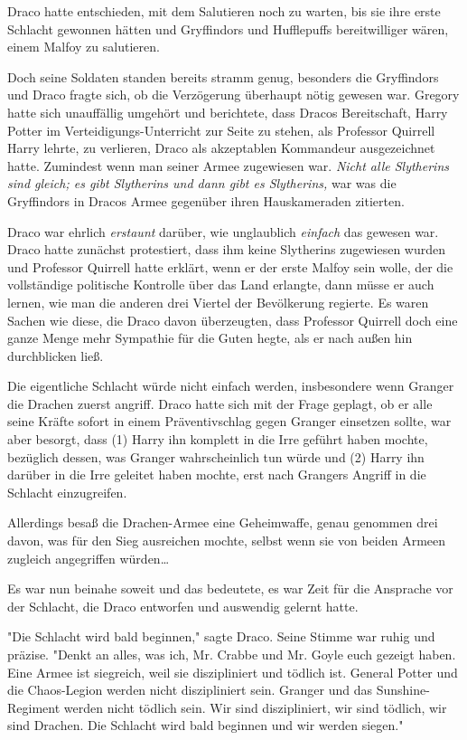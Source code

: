 {Draco hatte entschieden, mit dem Salutieren noch zu warten, bis sie ihre erste Schlacht gewonnen hätten und Gryffindors und Hufflepuffs bereitwilliger wären, einem Malfoy zu salutieren.

Doch seine Soldaten standen bereits stramm genug, besonders die Gryffindors und Draco fragte sich, ob die Verzögerung überhaupt nötig gewesen war. Gregory hatte sich unauffällig umgehört und berichtete, dass Dracos Bereitschaft, Harry Potter im Verteidigungs-Unterricht zur Seite zu stehen, als Professor Quirrell Harry lehrte, zu verlieren, Draco als akzeptablen Kommandeur ausgezeichnet hatte. Zumindest wenn man seiner Armee zugewiesen war. \emph{Nicht alle Slytherins sind gleich; es gibt Slytherins und dann gibt es Slytherins,} war was die Gryffindors in Dracos Armee gegenüber ihren Hauskameraden zitierten.

Draco war ehrlich \emph{erstaunt} darüber, wie unglaublich \emph{einfach} das gewesen war. Draco hatte zunächst protestiert, dass ihm keine Slytherins zugewiesen wurden und Professor Quirrell hatte erklärt, wenn er der erste Malfoy sein wolle, der die vollständige politische Kontrolle über das Land erlangte, dann müsse er auch lernen, wie man die anderen drei Viertel der Bevölkerung regierte. Es waren Sachen wie diese, die Draco davon überzeugten, dass Professor Quirrell doch eine ganze Menge mehr Sympathie für die Guten hegte, als er nach außen hin durchblicken ließ.

Die eigentliche Schlacht würde nicht einfach werden, insbesondere wenn Granger die Drachen zuerst angriff. Draco hatte sich mit der Frage geplagt, ob er alle seine Kräfte sofort in einem Präventivschlag gegen Granger einsetzen sollte, war aber besorgt, dass (1) Harry ihn komplett in die Irre geführt haben mochte, bezüglich dessen, was Granger wahrscheinlich tun würde und (2) Harry ihn darüber in die Irre geleitet haben mochte, erst nach Grangers Angriff in die Schlacht einzugreifen.

Allerdings besaß die Drachen-Armee eine Geheimwaffe, genau genommen drei davon, was für den Sieg ausreichen mochte, selbst wenn sie von beiden Armeen zugleich angegriffen würden…

Es war nun beinahe soweit und das bedeutete, es war Zeit für die Ansprache vor der Schlacht, die Draco entworfen und auswendig gelernt hatte.

"Die Schlacht wird bald beginnen," sagte Draco. Seine Stimme war ruhig und präzise. "Denkt an alles, was ich, Mr. Crabbe und Mr. Goyle euch gezeigt haben. Eine Armee ist siegreich, weil sie diszipliniert und tödlich ist. General Potter und die Chaos-Legion werden nicht diszipliniert sein. Granger und das Sunshine-Regiment werden nicht tödlich sein. Wir sind diszipliniert, wir sind tödlich, wir sind Drachen. Die Schlacht wird bald beginnen und wir werden siegen."

}
